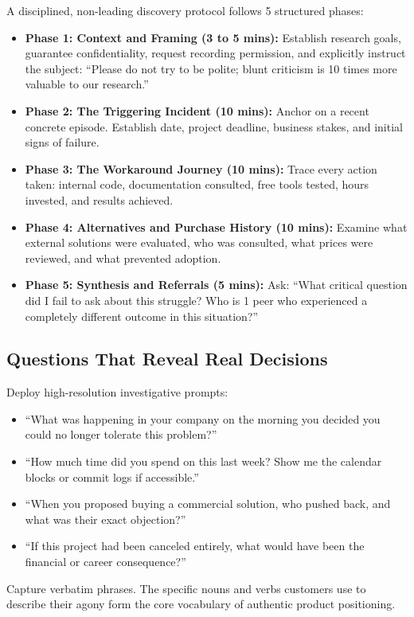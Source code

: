 A disciplined, non-leading discovery protocol follows 5 structured phases:
\begin{itemize}[leftmargin=1.2em,itemsep=0.2ex]
  \item \textbf{Phase 1: Context and Framing (3 to 5 mins):} Establish research goals, guarantee confidentiality, request recording permission, and explicitly instruct the subject: ``Please do not try to be polite; blunt criticism is 10 times more valuable to our research.''
  \item \textbf{Phase 2: The Triggering Incident (10 mins):} Anchor on a recent concrete episode. Establish date, project deadline, business stakes, and initial signs of failure.
  \item \textbf{Phase 3: The Workaround Journey (10 mins):} Trace every action taken: internal code, documentation consulted, free tools tested, hours invested, and results achieved.
  \item \textbf{Phase 4: Alternatives and Purchase History (10 mins):} Examine what external solutions were evaluated, who was consulted, what prices were reviewed, and what prevented adoption.
  \item \textbf{Phase 5: Synthesis and Referrals (5 mins):} Ask: ``What critical question did I fail to ask about this struggle? Who is 1 peer who experienced a completely different outcome in this situation?''
\end{itemize}

\subsection{Questions That Reveal Real Decisions}

Deploy high-resolution investigative prompts:
\begin{itemize}[leftmargin=1.2em,itemsep=0.2ex]
  \item ``What was happening in your company on the morning you decided you could no longer tolerate this problem?''
  \item ``How much time did you spend on this last week? Show me the calendar blocks or commit logs if accessible.''
  \item ``When you proposed buying a commercial solution, who pushed back, and what was their exact objection?''
  \item ``If this project had been canceled entirely, what would have been the financial or career consequence?''
\end{itemize}
Capture verbatim phrases. The specific nouns and verbs customers use to describe their agony form the core vocabulary of authentic product positioning.
